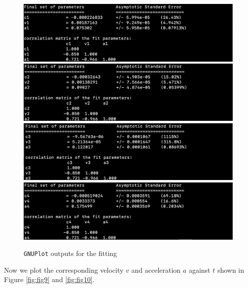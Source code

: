 \documentclass[11pt, a4paper, abstract=true]{scrartcl}
\begin{document}
\begin{figure}[H]
    \centering
    \includegraphics[scale=0.55]{assets/gnuplot_shots/21.png}
    \includegraphics[scale=0.55]{assets/gnuplot_shots/22.png}
    \includegraphics[scale=0.55]{assets/gnuplot_shots/23.png}
    \includegraphics[scale=0.55]{assets/gnuplot_shots/24.png}
    \caption{\texttt{GNUPlot} outputs for the fitting}
    \label{fig:fig8}
\end{figure}
Now we plot the corresponding velocity \(v\) and acceleration \(a\) against \(t\) shown in Figure \ref{fig:fig9} and \ref{fig:fig10}.
\end{document}
